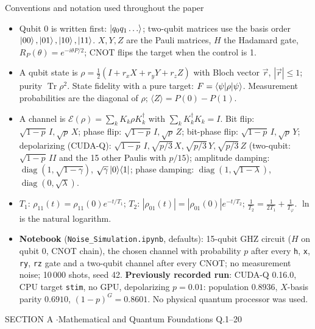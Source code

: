 \documentclass[11pt,a4paper]{article}
\begin{document}
\begin{infobox}{Conventions and notation used throughout the paper}
\footnotesize
\begin{itemize}[leftmargin=1.2em, itemsep=1pt, topsep=2pt]
\item Qubit 0 is written first: $\ket{q_0q_1\dots}$; two-qubit matrices use the basis order $\ket{00}, \ket{01}, \ket{10}, \ket{11}$. $X, Y, Z$ are the Pauli matrices,
      $H$ the Hadamard gate, $R_P(\theta) = e^{-i\theta P/2}$; CNOT flips the target when the control is 1.
\item A qubit state is $\rho = \frac12(I + r_xX + r_yY + r_zZ)$ with Bloch vector $\vec r$, $|\vec r| \le 1$; purity $\operatorname{Tr}\rho^2$. State fidelity with a pure target:
      $F = \braket{\psi|\rho|\psi}$. Measurement probabilities are the diagonal of $\rho$; $\langle Z\rangle = P(0) - P(1)$.
\item A channel is $\mathcal E(\rho) = \sum_kK_k\rho K_k^\dagger$ with $\sum_kK_k^\dagger K_k = I$. Bit flip: $\sqrt{1-p}\,I, \sqrt p\,X$; phase flip: $\sqrt{1-p}\,I, \sqrt p\,Z$;
      bit-phase flip: $\sqrt{1-p}\,I, \sqrt p\,Y$; depolarizing (CUDA-Q): $\sqrt{1-p}\,I, \sqrt{p/3}\,X, \sqrt{p/3}\,Y, \sqrt{p/3}\,Z$ (two-qubit: $\sqrt{1-p}\,II$ and the 15
      other Paulis with $p/15$); amplitude damping: $\operatorname{diag}(1, \sqrt{1-\gamma})$, $\sqrt\gamma\ket0\!\bra1$; phase damping: $\operatorname{diag}(1, \sqrt{1-\lambda})$, $\operatorname{diag}(0, \sqrt\lambda)$.
\item $T_1$: $\rho_{11}(t) = \rho_{11}(0)e^{-t/T_1}$; $T_2$: $|\rho_{01}(t)| = |\rho_{01}(0)|e^{-t/T_2}$; $\frac1{T_2} = \frac1{2T_1} + \frac1{T_\varphi}$. $\ln$ is the natural logarithm.
\item \textbf{Notebook} (\texttt{Noise\_Simulation.ipynb}, defaults): 15-qubit GHZ circuit ($H$ on qubit 0, CNOT chain), the chosen channel with probability $p$ after
      every \texttt{h}, \texttt{x}, \texttt{ry}, \texttt{rz} gate and a two-qubit channel after every CNOT; no measurement noise; 10\,000 shots, seed 42.
      \textbf{Previously recorded run}: CUDA-Q 0.16.0, CPU target \texttt{stim}, no GPU, depolarizing $p = 0.01$: population $0.8936$, $X$-basis parity $0.6910$,
      $(1-p)^G = 0.8601$. No physical quantum processor was used.
\end{itemize}
\end{infobox}
\newpage

\begin{sectionbanner}SECTION A \enspace$\cdot$\enspace Mathematical and Quantum Foundations \hfill Q.1--20\end{sectionbanner}
\end{document}
